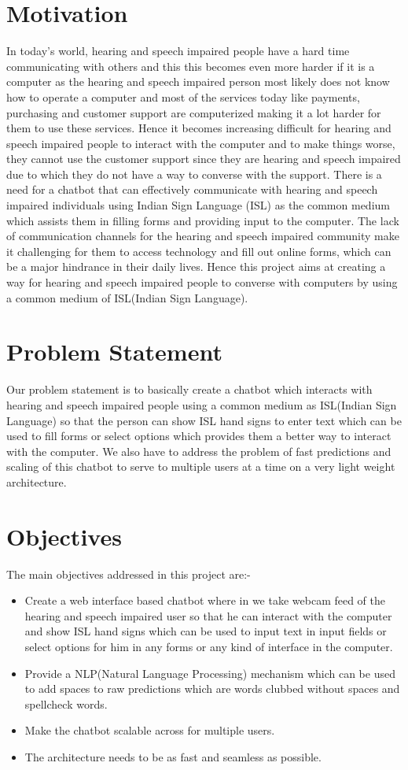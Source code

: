 \documentclass[12pt,a4paper]{report}
\begin{document}
\section{Motivation}
In today's world, hearing and speech impaired people have a hard time communicating with others and this this becomes even more harder if it is a computer as the hearing and speech impaired person most likely does not know how to operate a computer and most of the services today like payments, purchasing and customer support are computerized making it a lot harder for them to use these services. Hence it becomes increasing difficult for hearing and speech impaired people to interact with the computer and to make things worse, they cannot use the customer support since they are hearing and speech impaired due to which they do not have a way to converse with the support. There is a need for a chatbot that can effectively communicate with hearing and speech impaired individuals using Indian Sign Language (ISL) as the common medium which assists them in filling forms and providing input to the computer. The lack of communication channels for the hearing and speech impaired community make it challenging for them to access technology and fill out online forms, which can be a major hindrance in their daily lives. Hence this project aims at creating a way for hearing and speech impaired people to converse with computers by using a common medium of ISL(Indian Sign Language).


\section{Problem Statement}
Our problem statement is to basically create a chatbot which interacts with hearing and speech impaired people using a common medium as ISL(Indian Sign Language) so that the person can show ISL hand signs to enter text which can be used to fill forms or select options which provides them a better way to interact with the computer. We also have to address the problem of fast predictions and scaling of this chatbot to serve to multiple users at a time on a very light weight architecture.

\section{Objectives}
The main objectives addressed in this project are:-
\begin{itemize}
	\item Create a web interface based chatbot where in we take webcam feed of the hearing and speech impaired user so that he can interact with the computer and show ISL hand signs which can be used to input text in input fields or select options for him in any forms or any kind of interface in the computer.
	\item Provide a NLP(Natural Language Processing) mechanism which can be used to add spaces to raw predictions which are words clubbed without spaces and spellcheck words.
	\item Make the chatbot scalable across for multiple users.
	\item The architecture needs to be as fast and seamless as possible.
\end{itemize}
\end{document}
